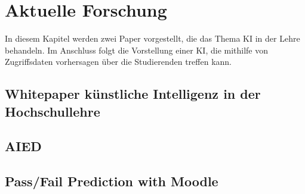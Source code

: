 \chapter{Aktuelle Forschung}
In diesem Kapitel werden zwei Paper vorgestellt, die das Thema KI in der Lehre behandeln.
Im Anschluss folgt die Vorstellung einer KI, die mithilfe von Zugriffsdaten vorhersagen über die Studierenden treffen kann.

\section{Whitepaper künstliche Intelligenz in der Hochschullehre}

\section{AIED}

\section{Pass/Fail Prediction with Moodle}
